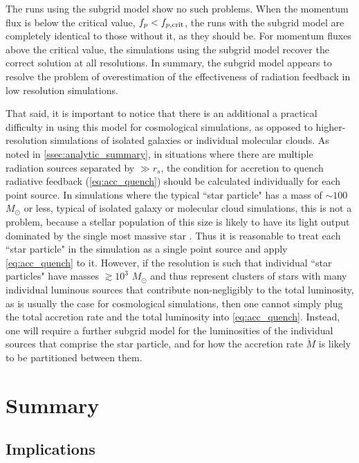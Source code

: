 \documentclass[useAMS,usenatbib]{mn2e}
\begin{document}
The runs using the subgrid model show no such problems. When the momentum flux is below the critical value, $f_p < f_{p,\rm crit}$, the runs with the subgrid model are completely identical to those without it, as they should be. For momentum fluxes above the critical value, the simulations using the subgrid model recover the correct solution at all resolutions. In summary, the subgrid model appears to resolve the problem of overestimation of the effectiveness of radiation feedback in low resolution simulations.

That said, it is important to notice that there is an additional a practical difficulty in using this model for cosmological  simulations, as opposed to higher-resolution simulations of isolated galaxies or individual molecular clouds. As noted in \autoref{ssec:analytic_summary}, in situations where there are multiple radiation sources separated by $\gg r_s$, the condition for accretion to quench radiative feedback (\autoref{eq:acc_quench}) should be calculated individually for each point source. In simulations where the typical ``star particle" has a mass of $\sim 100$ $M_\odot$ or less, typical of isolated galaxy or molecular cloud simulations, this is not a problem, because a stellar population of this size is likely to have its light output dominated by the single most massive star \citep[e.g.,][]{da-silva12a}. Thus it is reasonable to treat each ``star particle" in the simulation as a single point source and apply \autoref{eq:acc_quench} to it. However, if the resolution is such that individual ``star particles" have masses $\gtrsim 10^3$ $M_\odot$ and thus represent clusters of stars with many individual luminous sources that contribute non-negligibly to the total luminosity, as is usually the case for cosmological simulations, then one cannot simply plug the total accretion rate and the total luminosity into \autoref{eq:acc_quench}. Instead, one will require a further subgrid model for the luminosities of the individual sources that comprise the star particle, and for how the accretion rate $\dot{M}$ is likely to be partitioned between them. 


\section{Summary}
\label{sec:conclusion}

\subsection{Implications}
\end{document}
